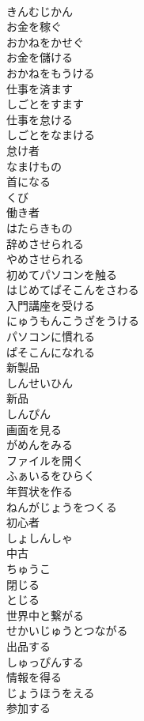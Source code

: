 \documentclass[8pt]{extreport}
\begin{document}
\begin{CJK}{UTF8}{min}
\\	きんむじかん
\\	お金を稼ぐ	
\\	おかねをかせぐ
\\	お金を儲ける	
\\	おかねをもうける
\\	仕事を済ます	
\\	しごとをすます
\\	仕事を怠ける	
\\	しごとをなまける
\\	怠け者	
\\	なまけもの
\\	首になる	
\\	くび
\\	働き者	
\\	はたらきもの
\\	辞めさせられる	
\\	やめさせられる
\\	初めてパソコンを触る	
\\	はじめてぱそこんをさわる
\\	入門講座を受ける	
\\	にゅうもんこうざをうける
\\	パソコンに慣れる	
\\	ぱそこんになれる
\\	新製品	
\\	しんせいひん
\\	新品	
\\	しんぴん
\\	画面を見る	
\\	がめんをみる
\\	ファイルを開く	
\\	ふぁいるをひらく
\\	年賀状を作る	
\\	ねんがじょうをつくる
\\	初心者	
\\	しょしんしゃ
\\	中古	
\\	ちゅうこ
\\	閉じる	
\\	とじる
\\	世界中と繋がる	
\\	せかいじゅうとつながる
\\	出品する	
\\	しゅっぴんする
\\	情報を得る	
\\	じょうほうをえる
\\	参加する	

\end{CJK}
\end{document}
